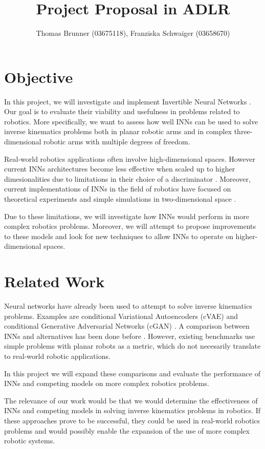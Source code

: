 \documentclass[12pt]{extarticle}
\title{Project Proposal in ADLR}
\author{Thomas Brunner (03675118), Franziska Schwaiger (03658670)}
\begin{document}
\maketitle

\section*{Objective}

In this project, we will investigate and implement Invertible Neural Networks \cite{Ardizzone2018}.
Our goal is to evaluate their viability and usefulness in problems related to robotics.
More specifically, we want to assess how well INNs can be used to solve inverse kinematics problems
both in planar robotic arms and in complex three-dimensional robotic arms with multiple degrees of freedom.

Real-world robotics applications often involve high-dimensional spaces.
However current INNs architectures become less effective when scaled up to higher dimesionalities
due to limitations in their choice of a discriminator \cite{Ardizzone2018}.
Moreover, current implementations of INNs in the field of robotics have focused on theoretical experiments
and simple simulations in two-dimensional space \cite{Ardizzone2018}.

Due to these limitations, we will investigate how INNs would perform in more complex robotics problems.
Moreover, we will attempt to propose improvements to these models and look for new techniques to allow
INNs to operate on higher-dimensional spaces.

\section*{Related Work}

Neural networks have already been used to attempt to solve inverse kinematics problems.
Examples are conditional Variational Autoencoders (cVAE) \cite{Sohn2015}
and conditional Generative Adversarial Networks (cGAN) \cite{Mehdi2018}.
A comparison between INNs and alternatives has been done before \cite{Kruse2019}.
However, existing benchmarks use simple problems with planar robots as a metric,
which do not necesarily translate to real-world robotic applications.

In this project we will expand these comparisons and evaluate the performance of INNs and competing models on
more complex robotics problems.

The relevance of our work would be that we would determine the effectiveness of INNs
and competing models in solving inverse kinematics problems in robotics.
If these approaches prove to be successful, they could be used in real-world robotics problems
and would possibly enable the expansion of the use of more complex robotic systems.
\end{document}
